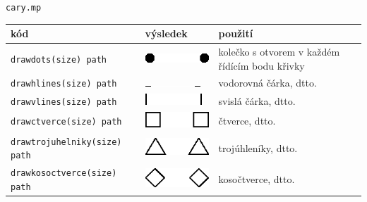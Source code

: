 \documentclass[a4paper,10pt]{article}
\begin{document}
{\centering\large\texttt{cary.mp}\nopagebreak\\\vspace{-12pt}\noindent}
\begin{tabularx}{\textwidth}{|l|l|X|}\hline
    kód & výsledek & použití\\\hline
    \verb+drawdots(size) path+ & \includegraphics{mp_cary_1} & 
	kolečko s otvorem v každém řídícím bodu křivky\\\hline
    \verb+drawhlines(size) path+ & \includegraphics{mp_cary_2}&
	vodorovná čárka, dtto.\\\hline
    \verb+drawvlines(size) path+ & \includegraphics{mp_cary_3}&
	svislá čárka, dtto.\\\hline
    \verb+drawctverce(size) path+ & \includegraphics{mp_cary_4}&
	čtverce, dtto.\\\hline
    \verb+drawtrojuhelniky(size) path+ & \includegraphics{mp_cary_5}&
	trojúhleníky, dtto.\\\hline
    \verb+drawkosoctverce(size) path+ & \includegraphics{mp_cary_6}&
	kosočtverce, dtto.
{} {} {} {} {} {} {} {} {} {} {} {} {} {} {} {} {} {} {} {} {} {} {} {} {} {} {} {} {} {} {} {} {} {} {} {} {} {} {} {} {} {} {} {} {} {} {} {} {} {} {} {} {} {} {} {} {} {} {} {} {} {} {} {} {} {} {} {} {} {} {} {} {} {} {} {} {} {} {} {} {} {} {} {} {} {} {} {} {} {} {} {} {} {} {} {} {} {} {} {} {} {} {} {} {} {} {} {} {} {} {} {} {} {} {} {} {} {} {} {} {} {} {} {} {} {} {} {}
\\\hline
\end{tabularx}\bigskip
\end{document}

